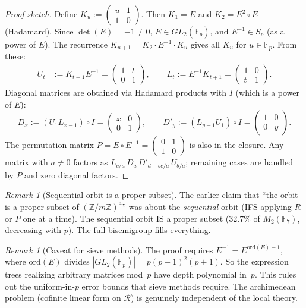 \documentclass[11pt,a4paper]{article}
\theoremstyle{definition}
\theoremstyle{remark}
\newtheorem{remark}[theorem]{Remark}
\newcommand{\FF}{\mathbb{F}}
\newcommand{\ZZ}{\mathbb{Z}}
\newcommand{\cR}{\mathcal{R}}
\begin{document}
\begin{proof}[Proof sketch]
Define $K_u := \left(\begin{smallmatrix}u&1\\1&0\end{smallmatrix}\right)$. Then $K_1 = E$ and $K_2 = E^2 \circ E$ (Hadamard). Since $\det(E) = -1 \neq 0$, $E \in GL_2(\FF_p)$, and $E^{-1} \in S_p$ (as a power of $E$). The recurrence $K_{u+1} = K_2 \cdot E^{-1} \cdot K_u$ gives all $K_u$ for $u \in \FF_p$. From these:
\begin{align*}
U_t &:= K_{t+1} E^{-1} = \begin{pmatrix}1&t\\0&1\end{pmatrix}, \qquad
L_t := E^{-1} K_{t+1} = \begin{pmatrix}1&0\\t&1\end{pmatrix}.
\end{align*}
Diagonal matrices are obtained via Hadamard products with $I$ (which is a power of $E$):
\[
D_x := (U_1 L_{x-1}) \circ I = \begin{pmatrix}x&0\\0&1\end{pmatrix}, \qquad
D'_y := (L_{y-1} U_1) \circ I = \begin{pmatrix}1&0\\0&y\end{pmatrix}.
\]
The permutation matrix $P = E \circ E^{-1} = \left(\begin{smallmatrix}0&1\\1&0\end{smallmatrix}\right)$ is also in the closure. Any matrix with $a \neq 0$ factors as $L_{c/a} \, D_a \, D'_{d-bc/a} \, U_{b/a}$; remaining cases are handled by $P$ and zero diagonal factors.
\end{proof}

\begin{remark}[Sequential orbit is a proper subset]
The earlier claim that ``the orbit is a proper subset of $(\ZZ/m\ZZ)^4$'' was about the \emph{sequential} orbit (IFS applying $R$ or $P$ one at a time). The sequential orbit IS a proper subset (32.7\% of $M_2(\FF_7)$, decreasing with $p$). The full bisemigroup fills everything.
\end{remark}

\begin{remark}[Caveat for sieve methods]
The proof requires $E^{-1} = E^{\mathrm{ord}(E)-1}$, where $\mathrm{ord}(E)$ divides $|GL_2(\FF_p)| = p(p-1)^2(p+1)$. So the expression trees realizing arbitrary matrices mod~$p$ have depth polynomial in~$p$. This rules out the uniform-in-$p$ error bounds that sieve methods require. The archimedean problem (cofinite linear form on $\cR$) is genuinely independent of the local theory.
\end{remark}
\end{document}
